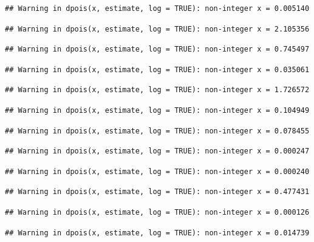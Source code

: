 \documentclass[]{article}
\begin{document}
\begin{verbatim}
## Warning in dpois(x, estimate, log = TRUE): non-integer x = 0.005140
\end{verbatim}

\begin{verbatim}
## Warning in dpois(x, estimate, log = TRUE): non-integer x = 2.105356
\end{verbatim}

\begin{verbatim}
## Warning in dpois(x, estimate, log = TRUE): non-integer x = 0.745497
\end{verbatim}

\begin{verbatim}
## Warning in dpois(x, estimate, log = TRUE): non-integer x = 0.035061
\end{verbatim}

\begin{verbatim}
## Warning in dpois(x, estimate, log = TRUE): non-integer x = 1.726572
\end{verbatim}

\begin{verbatim}
## Warning in dpois(x, estimate, log = TRUE): non-integer x = 0.104949
\end{verbatim}

\begin{verbatim}
## Warning in dpois(x, estimate, log = TRUE): non-integer x = 0.078455
\end{verbatim}

\begin{verbatim}
## Warning in dpois(x, estimate, log = TRUE): non-integer x = 0.000247
\end{verbatim}

\begin{verbatim}
## Warning in dpois(x, estimate, log = TRUE): non-integer x = 0.000240
\end{verbatim}

\begin{verbatim}
## Warning in dpois(x, estimate, log = TRUE): non-integer x = 0.477431
\end{verbatim}

\begin{verbatim}
## Warning in dpois(x, estimate, log = TRUE): non-integer x = 0.000126
\end{verbatim}

\begin{verbatim}
## Warning in dpois(x, estimate, log = TRUE): non-integer x = 0.014739
\end{verbatim}
\end{document}
